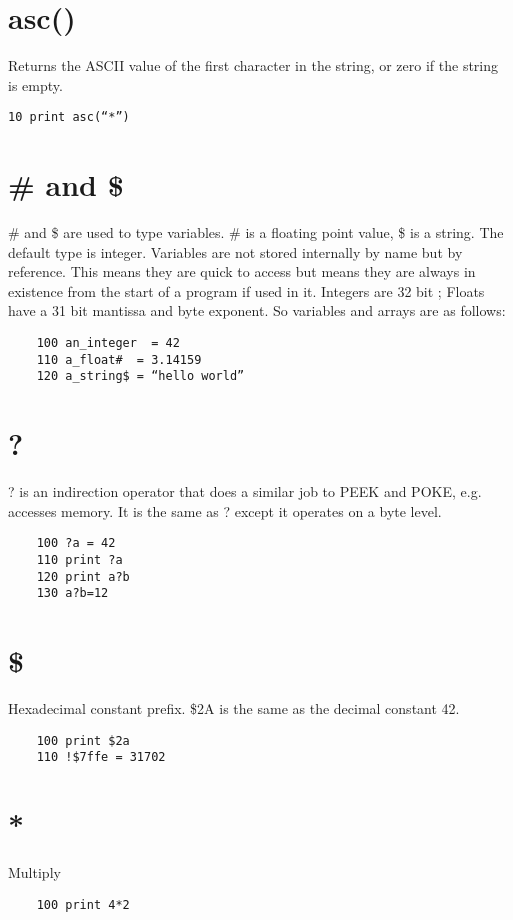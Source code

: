 \section*{asc()}
Returns the ASCII value of the first character in the string, or zero if the string is empty.
\example{}
\begin{verbatim}
10 print asc(“*”)
\end{verbatim}


\section*{\# and \$}
\# and \$ are used to type variables. \# is a floating point value, \$ is a string. The default type is integer. Variables are not stored internally by name but by reference. This means they are quick to access but means they are always in existence from the start of a program if used in it. Integers are 32 bit ; Floats have a 31 bit mantissa and byte exponent.
So variables and arrays are as follows:
\example{}
\begin{verbatim}
	100 an_integer  = 42
	110 a_float#  = 3.14159
	120 a_string$ = “hello world”
\end{verbatim}

\section*{?}
? is an indirection operator that does a similar job to PEEK and POKE, e.g. accesses memory. It is the same as ? except it operates on a byte level.
\example{}
\begin{verbatim}
	100 ?a = 42
	110 print ?a
	120 print a?b
	130 a?b=12
\end{verbatim}

\section*{\$}
Hexadecimal constant prefix. \$2A is the same as the decimal constant 42.
\example{}
\begin{verbatim}
	100 print $2a
	110 !$7ffe = 31702
\end{verbatim}

\section*{*}
Multiply
\example{}
\begin{verbatim}
	100 print 4*2
\end{verbatim}

